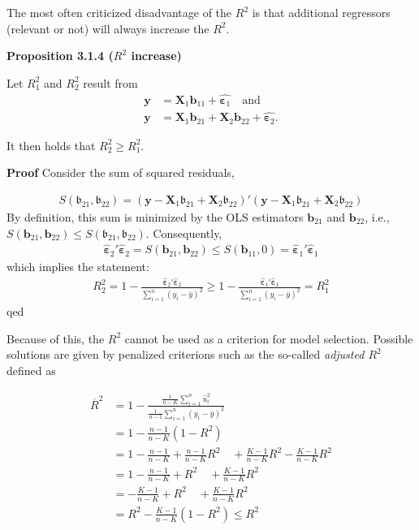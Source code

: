 \documentclass[
]{book}
\begin{document}
The most often criticized disadvantage of the \(R^2\) is that additional
regressors (relevant or not) will always increase the \(R^2\).

\textbf{Proposition 3.1.4 (\(R^2\) increase)}

Let \(R^2_1\) and \(R^2_2\) result from
\begin{align*}
    \mathbf{y} &= \mathbf{X}_1\mathbf{b}_{11}+\hat{\boldsymbol{\varepsilon}_1} \quad\text{and}\\
    \mathbf{y} &= \mathbf{X}_1\mathbf{b}_{21}+\mathbf{X}_2\mathbf{b}_{22}+\hat{\boldsymbol{\varepsilon}_2}.
\end{align*}

It then holds that \(R^2_2\geq R^2_1\).

\textbf{Proof}
Consider the sum of squared residuals,

\begin{align*}
S(\mathbf{\mathfrak{b}}_{21},\mathbf{\mathfrak{b}}_{22})=(\mathbf{y}-\mathbf{X}_1\mathbf{\mathfrak{b}}_{21}+\mathbf{X}_2\mathbf{\mathfrak{b}}_{22})'(\mathbf{y}-\mathbf{X}_1\mathbf{\mathfrak{b}}_{21}+\mathbf{X}_2\mathbf{\mathfrak{b}}_{22})
\end{align*}
By definition, this sum is minimized by the OLS estimators \(\mathbf{b}_{21}\)
and \(\mathbf{b}_{22}\), i.e.,
\(S(\mathbf{b}_{21},\mathbf{b}_{22})\leq S(\mathbf{\mathfrak{b}}_{21},\mathbf{\mathfrak{b}}_{22})\).
Consequently,
\begin{align*}
\hat{\boldsymbol{\varepsilon}}_{2}'\hat{\boldsymbol{\varepsilon}}_{2}=S(\mathbf{b}_{21},\mathbf{b}_{22})\leq S(\mathbf{b}_{11},0)=\hat{\boldsymbol{\varepsilon}}_{1}'\hat{\boldsymbol{\varepsilon}}_{1}
\end{align*}
which implies the statement:
\begin{align*}
R_2^2=1-\frac{\hat{\boldsymbol{\varepsilon}}_{2}'\hat{\boldsymbol{\varepsilon}}_{2}}{\sum_{i=1}^n\left(y_i-\bar{y}\right)^2}\geq
1-\frac{\hat{\boldsymbol{\varepsilon}}_{1}'\hat{\boldsymbol{\varepsilon}}_{1}}{\sum_{i=1}^n\left(y_i-\bar{y}\right)^2}=R_1^2
\end{align*}
qed

\hfill\break

Because of this, the \(R^2\) cannot be used as a criterion for model selection. Possible solutions are given by penalized criterions such as the so-called \emph{adjusted \(R^2\)} defined as

\begin{align*}
  \overline{R}^2 &= 1-\frac{ \frac{1}{n-K} \sum_{i=1}^n \hat{u}_i^2}{ \frac{1}{n-1} \sum_{i=1}^n \left(y_i-\bar{y}\right)^2} \\
   &= 1-\frac{n-1}{n-K}\left(1-R^2\right) \\
    &= 1-\frac{n-1}{n-K}+\frac{n-1}{n-K}R^2\quad+\frac{K-1}{n-K}R^2-\frac{K-1}{n-K}R^2 \\
    &= 1-\frac{n-1}{n-K}+R^2\quad+\frac{K-1}{n-K}R^2 \\
    &= -\frac{K-1}{n-K}+R^2\quad+\frac{K-1}{n-K}R^2 \\
   &= R^2-\frac{K-1}{n-K}\left(1-R^2\right) \leq R^2
\end{align*}
\end{document}
